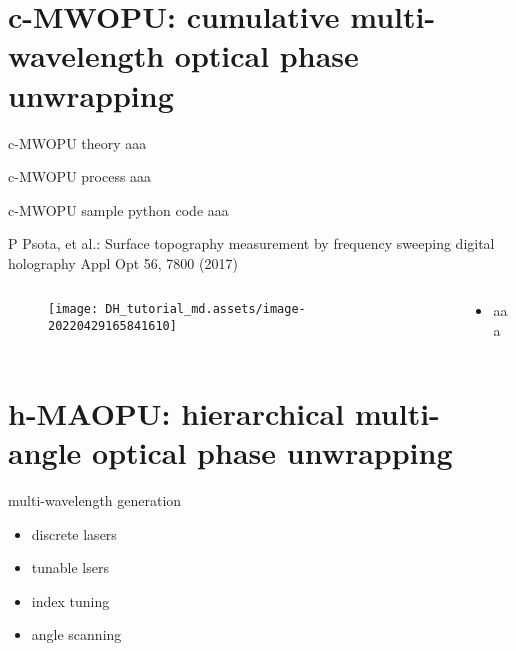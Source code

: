 \documentclass[t, aspectratio=169]{beamer}
\begin{document}
\section{c-MWOPU: cumulative multi-wavelength optical phase unwrapping}
\begin{frame}[c]
	\centering\LARGE\textbf{\secname}
\end{frame}


\begin{frame}{c-MWOPU theory}
aaa
\end{frame}


\begin{frame}{c-MWOPU process}
aaa
\end{frame}


\begin{frame}{c-MWOPU sample python code}
aaa
\end{frame}


\begin{frame}{P Psota, et al.: Surface topography measurement by frequency sweeping digital holography}
	\vspace{-3 mm}
	\small Appl Opt 56, 7800 (2017)
	\begin{columns}
		\begin{column}{.6\textwidth}
			\begin{figure}
				\texttt{[image: DH\_tutorial\_md.assets/image-20220429165841610]}
			\end{figure}
		\end{column}
		\begin{column}{.4\textwidth}
			\begin{itemize}
				\item aaa
			\end{itemize}
		\end{column}
	\end{columns}
\end{frame}


\section{h-MAOPU: hierarchical multi-angle optical phase unwrapping}
\begin{frame}[c]
	\centering\LARGE\textbf{\secname}
\end{frame}


\begin{frame}{multi-wavelength generation}
	\begin{itemize}
		\item discrete lasers
		\item tunable lsers
		\item index tuning
		\item angle scanning
	\end{itemize}
\end{frame}
\end{document}

